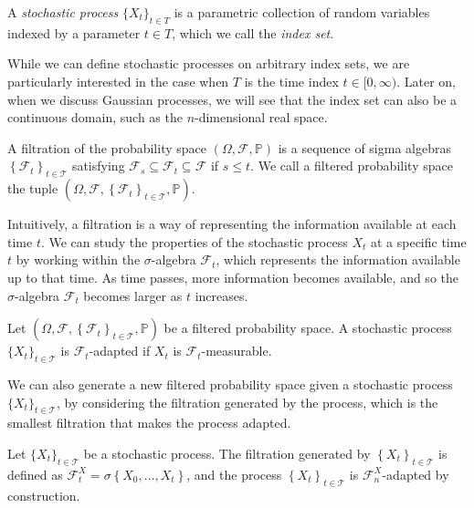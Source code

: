 \label{ntn:stochastic-process}
\begin{definition}
    \label{def:stochastic_process}
    A \textit{stochastic process} $\{X_t\}_{t \in T}$ is a parametric collection of random variables indexed by a parameter $t \in T$, which we call the \textit{index set}. 
\end{definition}

While we can define stochastic processes on arbitrary index sets, we are particularly interested in the case when $T$ is the time index $t \in [0, \infty)$. Later on, when we discuss Gaussian processes, we will see that the index set can also be a continuous domain, such as the $n$-dimensional real space.

\begin{definition}
    A filtration of the probability space $(\Omega, \mathcal{F}, \mathbb{P})$ is a sequence of sigma algebras $\left\{\mathcal{F}_t\right\}_{t \in \mathcal{T}}$ satisfying $\mathcal{F}_s \subseteq \mathcal{F}_t \subseteq \mathcal{F}$ if $s \leq t$.
    We call a filtered probability space the tuple $\left(\Omega, \mathcal{F},\left\{\mathcal{F}_t\right\}_{t \in \mathcal{T}}, \mathbb{P}\right)$\label{ntn:filtered_prob_space}\label{ntn:filtration}.
\end{definition}

Intuitively, a filtration is a way of representing the information available at each time $t$. We can study the properties of the stochastic process $X_t$ at a specific time $t$ by working within the $\sigma$-algebra $\mathcal{F}_t$, which represents the information available up to that time. As time passes, more information becomes available, and so the $\sigma$-algebra $\mathcal{F}_t$ becomes larger as $t$ increases.

\begin{definition}
    Let $\left(\Omega, \mathcal{F},\left\{\mathcal{F}_t\right\}_{t \in \mathcal{T}}, \mathbb{P}\right)$ be a filtered probability space. A stochastic process $\{X_t\}_{t \in \mathcal{T}}$ is $\mathcal{F}_t$-adapted if $X_t$ is $\mathcal{F}_t$-measurable.
\end{definition}

We can also generate a new filtered probability space given a stochastic process $\{X_t\}_{t \in \mathcal{T}}$, by considering the filtration generated by the process, which is the smallest filtration that makes the process adapted.

\begin{definition}
    Let $\{X_t\}_{t \in \mathcal{T}}$ be a stochastic process. The filtration generated by $\left\{X_t\right\}_{t \in \mathcal{T}}$ is defined as $\mathcal{F}_t^X=\sigma\left\{X_0, \ldots, X_t\right\}$, and the process $\left\{X_t\right\}_{t \in \mathcal{T}}$ is $\mathcal{F}_n^X$-adapted by construction.\label{ntn:filtration_generated_by_process}
\end{definition}

